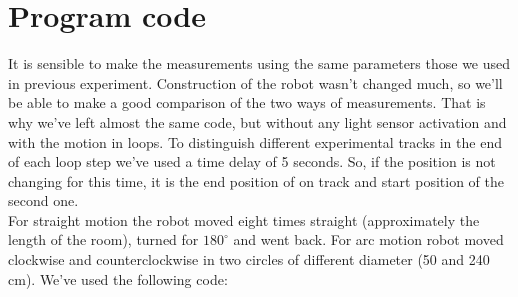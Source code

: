 \documentclass[a4paper, 12pt]{article}
\begin{document}
\section{Program code}

It is sensible to make the measurements using the same parameters those we used in previous experiment. Construction of the robot wasn't changed much, so we'll be able to make a good comparison of the two ways of measurements. That is why we've left almost the same code, but without any light sensor activation and with the motion in loops. To distinguish different experimental tracks in the end of each loop step we've used a time delay of 5 seconds. So, if the position is not changing for this time, it is the end position of on track and start position of the second one. \\ 
For straight motion the robot moved eight times straight (approximately the length of the room), turned for  $180^{\circ}$ and went back. For arc motion robot moved clockwise and counterclockwise in two circles of different diameter (50 and 240 cm). We've used the following code:
\end{document}
